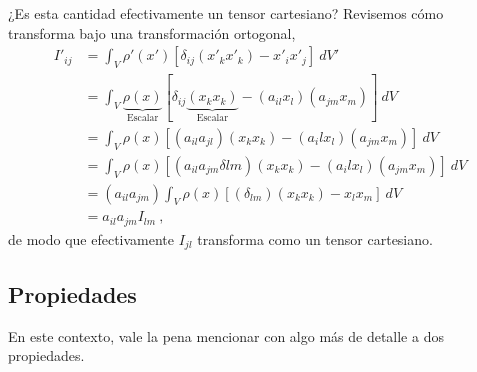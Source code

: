 \begin{ejemplo}
    ¿Es esta cantidad efectivamente un tensor cartesiano? Revisemos cómo transforma bajo una transformación ortogonal,
    \begin{align*}
        I'_{ij} & = \int_V \rho'(x') [\delta_{ij} (x'_k x'_k) - x'_i x'_j] \ dV' \\
        & = \int_V \underbrace{\rho(x)}_{\text{Escalar}} [\delta_{ij}\underbrace{(x_k x_k)}_\text{Escalar} - (a_{il} x_l)(a_{jm} x_m)] \ dV \\
        & = \int_V \rho(x) [(a_{il}a_{jl})(x_k x_k) - (a_il x_l)(a_{jm} x_m)] \ dV \\
        & = \int_V \rho(x) [(a_{il}a_{jm}\delta{lm})(x_k x_k) - (a_il x_l)(a_{jm} x_m)] \ dV \\
        & = (a_{il} a_{jm}) \int_V \rho(x) [(\delta_{lm})(x_k x_k) - x_l x_m] \ dV \\
        & = a_{il} a_{jm} I_{lm} \ ,
    \end{align*}
    de modo que efectivamente $I_{jl}$ transforma como un tensor cartesiano.
\end{ejemplo}

\subsection{Propiedades}

En este contexto, vale la pena mencionar con algo más de detalle a dos propiedades.


